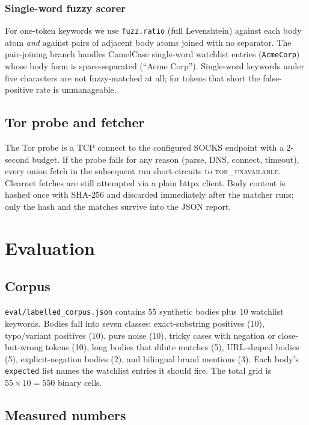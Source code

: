 \documentclass[conference]{IEEEtran}
\begin{document}
\subsubsection{Single-word fuzzy scorer}
For one-token keywords we use \texttt{fuzz.ratio} (full Levenshtein)
against each body atom \emph{and} against pairs of adjacent body
atoms joined with no separator. The pair-joining branch handles
CamelCase single-word watchlist entries (\texttt{AcmeCorp}) whose
body form is space-separated (``Acme Corp''). Single-word keywords
under five characters are not fuzzy-matched at all; for tokens that
short the false-positive rate is unmanageable.

\subsection{Tor probe and fetcher}
The Tor probe is a TCP connect to the configured SOCKS endpoint
with a 2-second budget. If the probe fails for any reason (parse,
DNS, connect, timeout), every onion fetch in the subsequent run
short-circuits to \textsc{tor\_unavailable}. Clearnet fetches are
still attempted via a plain httpx client. Body content is hashed
once with SHA-256 and discarded immediately after the matcher
runs; only the hash and the matches survive into the JSON report.

\section{Evaluation}

\subsection{Corpus}
\texttt{eval/labelled\_corpus.json} contains 55 synthetic bodies
plus 10 watchlist keywords. Bodies fall into seven classes:
exact-substring positives (10), typo/variant positives (10), pure
noise (10), tricky cases with negation or close-but-wrong tokens
(10), long bodies that dilute matches (5), URL-shaped bodies (5),
explicit-negation bodies (2), and bilingual brand mentions (3).
Each body's \texttt{expected} list names the watchlist entries it
should fire. The total grid is $55 \times 10 = 550$ binary cells.

\subsection{Measured numbers}
\end{document}
